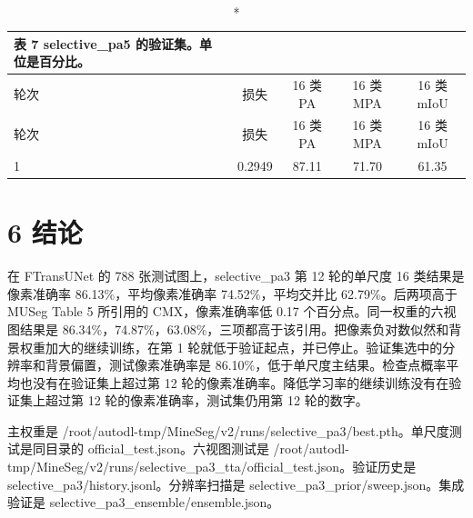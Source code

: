 \documentclass[11pt]{article}
\begin{document}
{\footnotesize\setlength{\tabcolsep}{3pt}
\begin{longtable}{lcccc}
\caption*{表 7  selective\_pa5 的验证集。单位是百分比。}\\
\toprule
轮次 & 损失 & 16 类 PA & 16 类 MPA & 16 类 mIoU\\
\midrule
\endfirsthead
\toprule
轮次 & 损失 & 16 类 PA & 16 类 MPA & 16 类 mIoU\\
\midrule
\endhead
1 & 0.2949 & 87.11 & 71.70 & 61.35\\
\bottomrule
\end{longtable}
}
\section*{6  结论}
在 FTransUNet 的 788 张测试图上，selective\_pa3 第 12 轮的单尺度 16 类结果是像素准确率 86.13\%，平均像素准确率 74.52\%，平均交并比 62.79\%。后两项高于 MUSeg Table 5 所引用的 CMX，像素准确率低 0.17 个百分点。同一权重的六视图结果是 86.34\%，74.87\%，63.08\%，三项都高于该引用。把像素负对数似然和背景权重加大的继续训练，在第 1 轮就低于验证起点，并已停止。验证集选中的分辨率和背景偏置，测试像素准确率是 86.10\%，低于单尺度主结果。检查点概率平均也没有在验证集上超过第 12 轮的像素准确率。降低学习率的继续训练没有在验证集上超过第 12 轮的像素准确率，测试集仍用第 12 轮的数字。

主权重是 /root/autodl-tmp/MineSeg/v2/runs/selective\_pa3/best.pth。单尺度测试是同目录的 official\_test.json。六视图测试是 /root/autodl-tmp/MineSeg/v2/runs/selective\_pa3\_tta/official\_test.json。验证历史是 selective\_pa3/history.jsonl。分辨率扫描是 selective\_pa3\_prior/sweep.json。集成验证是 selective\_pa3\_ensemble/ensemble.json。
\end{document}
